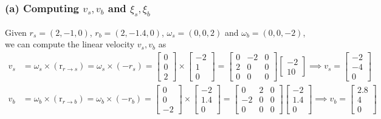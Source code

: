 \subsubsection*{(a) Computing \( v_{s}, v_{b} \) and \( \xi_{s}, \xi_{b} \)}

Given \( r_{s}=(2,-1,0) \), \( r_{b}=(2,-1.4,0) \), \( \omega_{s}=(0,0,2) \) and \( \omega_{b}=(0,0,-2) \), we can compute the linear velocity \( v_{s}, v_{b} \) as
\begin{align*}
    v_{s}
     & =
    \omega_{s} \times (\mathrm{r}_{r \to s})
    =
    \omega_{s} \times (-r_{s})
    =
    \begin{bmatrix}
        0 \\
        0 \\
        2
    \end{bmatrix}
    \times
    \begin{bmatrix}
        -2 \\
        1  \\
        0
    \end{bmatrix}
    =
    \begin{bmatrix}
        0 & -2 & 0 \\
        2 & 0  & 0 \\
        0 & 0  & 0
    \end{bmatrix}
    \begin{bmatrix}
        -2 \\
        1
        0
    \end{bmatrix}
    \implies
    \boxed{
        v_{s}
        =
        \begin{bmatrix}
            -2 \\
            -4 \\
            0
        \end{bmatrix}
    }
    \\
    v_{b}
     & =
    \omega_{b} \times (\mathrm{r}_{r \to b})
    =
    \omega_{b} \times (-r_{b})
    =
    \begin{bmatrix}
        0 \\
        0 \\
        -2
    \end{bmatrix}
    \times
    \begin{bmatrix}
        -2  \\
        1.4 \\
        0
    \end{bmatrix}
    =
    \begin{bmatrix}
        0  & 2 & 0 \\
        -2 & 0 & 0 \\
        0  & 0 & 0
    \end{bmatrix}
    \begin{bmatrix}
        -2  \\
        1.4 \\
        0
    \end{bmatrix}
    \implies
    \boxed{
        v_{b}
        =
        \begin{bmatrix}
            2.8 \\
            4   \\
            0
        \end{bmatrix}
    }
\end{align*}
